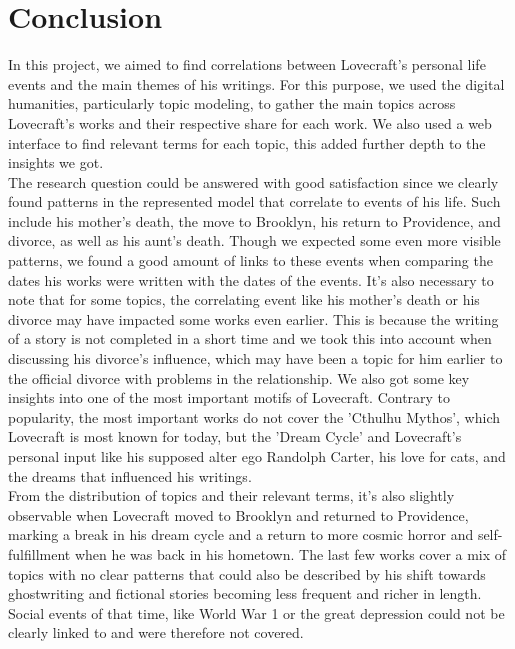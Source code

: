 \section{Conclusion}

In this project, we aimed to find correlations between Lovecraft's personal life events and the main 
themes of his writings. For this purpose, we used the digital humanities, particularly topic modeling, 
to gather the main topics across Lovecraft's works and their respective share for each work. We also 
used a web interface to find relevant terms for each topic, this added further depth to the insights 
we got.\\

The research question could be answered with good satisfaction since we clearly found patterns in 
the represented model that correlate to events of his life. Such include his mother's death, the 
move to Brooklyn, his return to Providence, and divorce, as well as his aunt's death. Though we 
expected some even more visible patterns, we found a good amount of links to these events when 
comparing the dates his works were written with the dates of the events. It's also necessary to 
note that for some topics, the correlating event like his mother's death or his divorce may have 
impacted some works even earlier. This is because the writing of a story is not completed in a 
short time and we took this into account when discussing his divorce's influence, which may have 
been a topic for him earlier to the official divorce with problems in the relationship. We also 
got some key insights into one of the most important motifs of Lovecraft. Contrary to popularity, 
the most important works do not cover the 'Cthulhu Mythos', which Lovecraft is most known for today, 
but the 'Dream Cycle' and Lovecraft's personal input like his supposed alter ego Randolph Carter, 
his love for cats, and the dreams that influenced his writings.\\

From the distribution of topics and their relevant terms, it's also slightly observable when 
Lovecraft moved to Brooklyn and returned to Providence, marking a break in his dream cycle and 
a return to more cosmic horror and self-fulfillment when he was back in his hometown. The last 
few works cover a mix of topics with no clear patterns that could also be described by his shift 
towards ghostwriting and fictional stories becoming less frequent and richer in length. Social 
events of that time, like World War 1 or the great depression could not be clearly linked to and 
were therefore not covered.\\

